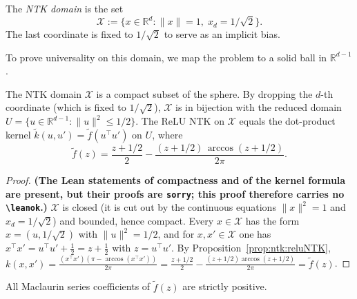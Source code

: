 \begin{definition}\label{def:ntk:domain}
The \emph{NTK domain} is the set
\[
  \mathcal{X} := \bigl\{x \in \mathbb{R}^d : \|x\| = 1,\; x_d = 1/\sqrt{2}\bigr\}.
\]
The last coordinate is fixed to $1/\sqrt{2}$ to serve as an implicit bias.
\end{definition}

To prove universality on this domain, we map the problem to a solid ball in $\mathbb{R}^{d-1}$.

\begin{lemma}\label{lem:ntk:reducedDomain}
  \leanok
The NTK domain $\mathcal{X}$ is a compact subset of the sphere. By dropping the $d$-th coordinate (which is fixed to $1/\sqrt{2}$), $\mathcal{X}$ is in bijection with the reduced domain $U = \{u \in \mathbb{R}^{d-1} : \|u\|^2 \le 1/2\}$. The ReLU NTK on $\mathcal{X}$ equals the dot-product kernel $\tilde{k}(u, u') = \tilde{f}(u^\top u')$ on $U$, where
\[
  \tilde{f}(z) = \frac{z + 1/2}{2} - \frac{(z+1/2)\,\arccos(z+1/2)}{2\pi}.
\]
\end{lemma}

\begin{proof}
\textbf{(The Lean statements of compactness and of the kernel formula are present, but their proofs are \texttt{sorry}; this proof therefore carries no \texttt{\textbackslash leanok}.)}
$\mathcal X$ is closed (it is cut out by the continuous equations $\|x\|^2=1$ and $x_d=1/\sqrt2$) and bounded, hence compact. Every $x\in\mathcal X$ has the form $x=(u,1/\sqrt2)$ with $\|u\|^2=1/2$, and for $x,x'\in\mathcal X$ one has $x^\top x'=u^\top u'+\tfrac12=z+\tfrac12$ with $z=u^\top u'$. By Proposition~\ref{prop:ntk:reluNTK}, $k(x,x')=\frac{(x^\top x')(\pi-\arccos(x^\top x'))}{2\pi}=\frac{z+1/2}2-\frac{(z+1/2)\arccos(z+1/2)}{2\pi}=\tilde f(z)$.
\end{proof}

\begin{lemma}\label{lem:ntk:reducedKernelCoeff}
  \leanok
All Maclaurin series coefficients of $\tilde{f}(z)$ are strictly positive.
\end{lemma}

